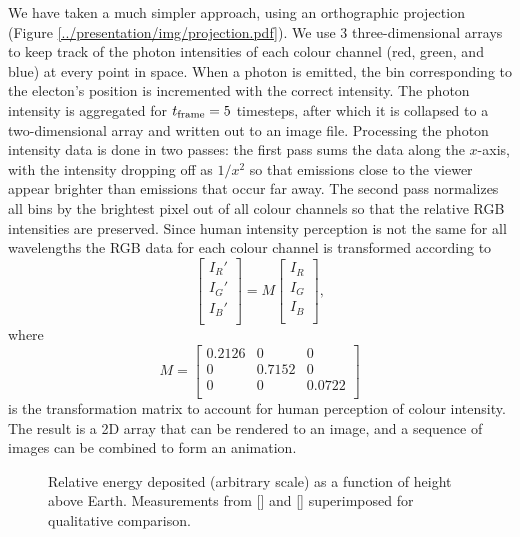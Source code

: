 \documentclass[twocolumn]{article}
\renewcommand{\insertfigure}[3]{\begin{figure}[tbh]
\centering
	\makebox[\columnwidth][c]{
	\texttt{[image: \#1]}
	}
\caption{#3}
\label{#1}
\end{figure}}
\begin{document}
We have taken a much simpler approach, using an orthographic projection (Figure \ref{../presentation/img/projection.pdf}).  We use 3 three-dimensional arrays to keep track of the photon intensities of each colour channel (red, green, and blue) at every point in space.  When a photon is emitted, the bin corresponding to the electon's position is incremented with the correct intensity. The photon intensity is aggregated for $t_{\mathrm{frame}}=5$ timesteps, after which it is collapsed to a two-dimensional array and written out to an image file. Processing the photon intensity data is done in two passes: the first pass sums the data along the $x$-axis, with the intensity dropping off as $1/x^2$ so that emissions close to the viewer appear brighter than emissions that occur far away.  The second pass normalizes all bins by the brightest pixel out of all colour channels so that the relative RGB intensities are preserved.  Since human intensity perception is not the same for all wavelengths the RGB data for each colour channel is transformed according to
\begin{equation}
\begin{bmatrix}
I_R' \\
I_G' \\
I_B' \\
\end{bmatrix} = 
M
\begin{bmatrix}
I_R \\
I_G \\
I_B \\
\end{bmatrix},
\end{equation}
where
\begin{equation}
M=
\begin{bmatrix}
0.2126 & 0 & 0 \\
0 & 0.7152 & 0 \\
0 & 0 & 0.0722 \\
\end{bmatrix}
\end{equation}
is the transformation matrix to account for human perception of colour intensity\cite{ZahidHasan2012}.  The result is a 2D array that can be rendered to an image, and a sequence of images can be combined to form an animation.





\insertfigure{../presentation/img/energy_deposition.pdf}{1.1}{Relative energy deposited (arbitrary scale) as a function of height above Earth.  Measurements from [\citen{Wedlund2013}] and [\citen{Ishikawa2013}] superimposed for qualitative comparison.}
\end{document}
